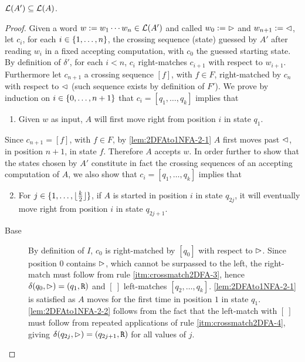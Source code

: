 \begin{lemm}\label{lem:2DFAto1NFA-2}
	$\mathcal L(A')\subseteq\mathcal L(A)$.
\end{lemm}
\begin{proof}
	Given a word $w:=w_1\cdots w_n\in\mathcal L(A')$ and called $w_0:=\rhd$ and $w_{n+1}:=\lhd$, let $c_i$, for each $i\in\{1,\dots,n\}$, the crossing sequence (state) guessed by $A'$ after reading $w_i$ in a fixed accepting computation, with $c_0$ the guessed starting state.
	By definition of $\delta'$, for each $i<n$, $c_i$ right-matches $c_{i+1}$ with respect to $w_{i+1}$.
	Furthermore let $c_{n+1}$ a crossing sequence $[f]$, with $f\in F$, right-matched by $c_n$ with respect to $\lhd$ (such sequence exists by definition of $F'$).
	We prove by induction on $i\in\{0,\dots,n+1\}$ that $c_i=[q_1,\dots,q_k]$ implies that
	\begin{enumerate}[(1)]
		\item \label{lem:2DFAto1NFA-2-1} Given $w$ as input, $A$ will first move right from position $i$ in state $q_1$.
	\end{enumerate}
	Since $c_{n+1}=[f]$, with $f\in F$, by \ref{lem:2DFAto1NFA-2-1} $A$ first moves past $\lhd$, in position $n+1$, in state $f$. Therefore $A$ accepts $w$.
	In order further to show that the states chosen by $A'$ constitute in fact the crossing sequences of an accepting computation of $A$, we also show that $c_i=[q_1,\dots,q_k]$ implies that
	\begin{enumerate}[(1)]
		\setcounter{enumi}{1}
		\item \label{lem:2DFAto1NFA-2-2} For $j\in\{1,\dots,\lfloor \frac{k}{2} \rfloor\}$, if $A$ is started in position $i$ in state $q_{2j}$, it will eventually move right from position $i$ in state $q_{2j+1}$.
	\end{enumerate}
	\begin{description}
		\item[Base] By definition of $I$, $c_0$ is right-matched by $[q_0]$ with respect to $\rhd$. Since position $0$ contains $\rhd$, which cannot be surpassed to the left, the right-match must follow from rule \ref{itm:crossmatch2DFA-3}, hence $\delta(q_0,\rhd)=(q_1,\mathtt R)$ and $[~]$ left-matches $[q_2,\dots,q_k]$.
		      \ref{lem:2DFAto1NFA-2-1} is satisfied as $A$ moves for the first time in position $1$ in state $q_1$.
		      \ref{lem:2DFAto1NFA-2-2} follows from the fact that the left-match with $[~]$ must follow from repeated applications of rule \ref{itm:crossmatch2DFA-4}, giving $\delta(q_{2j},\rhd)=(q_{2j+1},\mathtt R)$ for all values of $j$.

\end{description}
\end{proof}
